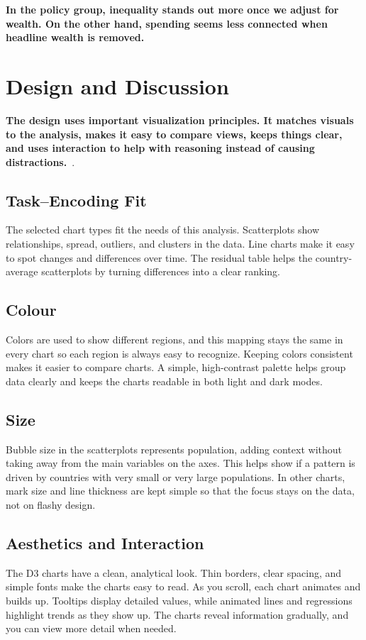 \documentclass{vgtc}
\begin{document}
\textbf{In the policy group, inequality stands out more once we adjust for wealth. On the other hand, spending seems less connected when headline wealth is removed.}

\section{Design and Discussion}
\textbf{The design uses important visualization principles. It matches visuals to the analysis, makes it easy to compare views, keeps things clear, and uses interaction to help with reasoning instead of causing distractions.}~\cite{munzner,bostock}.

\subsection{Task--Encoding Fit}
The selected chart types fit the needs of this analysis. Scatterplots show relationships, spread, outliers, and clusters in the data. Line charts make it easy to spot changes and differences over time. The residual table helps the country-average scatterplots by turning differences into a clear ranking.

\subsection{Colour}
Colors are used to show different regions, and this mapping stays the same in every chart so each region is always easy to recognize. Keeping colors consistent makes it easier to compare charts. A simple, high-contrast palette helps group data clearly and keeps the charts readable in both light and dark modes.

\subsection{Size}
Bubble size in the scatterplots represents population, adding context without taking away from the main variables on the axes. This helps show if a pattern is driven by countries with very small or very large populations. In other charts, mark size and line thickness are kept simple so that the focus stays on the data, not on flashy design.

\subsection{Aesthetics and Interaction}
The D3 charts have a clean, analytical look. Thin borders, clear spacing, and simple fonts make the charts easy to read. As you scroll, each chart animates and builds up. Tooltips display detailed values, while animated lines and regressions highlight trends as they show up. The charts reveal information gradually, and you can view more detail when needed.
\end{document}
